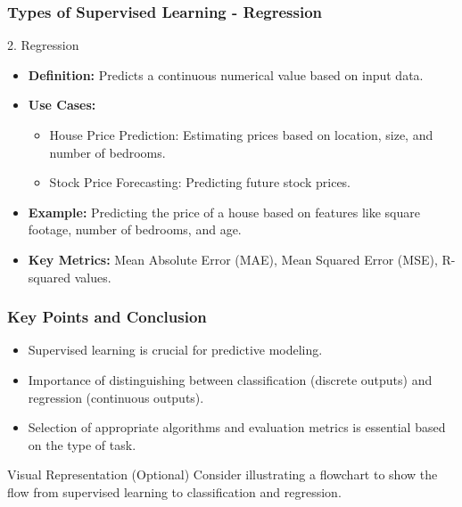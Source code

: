 \documentclass[aspectratio=169]{beamer}
\begin{document}
\begin{frame}[fragile]
    \frametitle{Types of Supervised Learning - Regression}
    \begin{block}{2. Regression}
        \begin{itemize}
            \item \textbf{Definition:} Predicts a continuous numerical value based on input data.
            \item \textbf{Use Cases:}
                \begin{itemize}
                    \item House Price Prediction: Estimating prices based on location, size, and number of bedrooms.
                    \item Stock Price Forecasting: Predicting future stock prices.
                \end{itemize}
            \item \textbf{Example:} 
                Predicting the price of a house based on features like square footage, number of bedrooms, and age.
            \item \textbf{Key Metrics:} Mean Absolute Error (MAE), Mean Squared Error (MSE), R-squared values.
        \end{itemize}
    \end{block}
\end{frame}

\begin{frame}[fragile]
    \frametitle{Key Points and Conclusion}
    \begin{itemize}
        \item Supervised learning is crucial for predictive modeling.
        \item Importance of distinguishing between classification (discrete outputs) and regression (continuous outputs).
        \item Selection of appropriate algorithms and evaluation metrics is essential based on the type of task.
    \end{itemize}
    \begin{block}{Visual Representation (Optional)}
        Consider illustrating a flowchart to show the flow from supervised learning to classification and regression.
    \end{block}
\end{frame}
\end{document}
